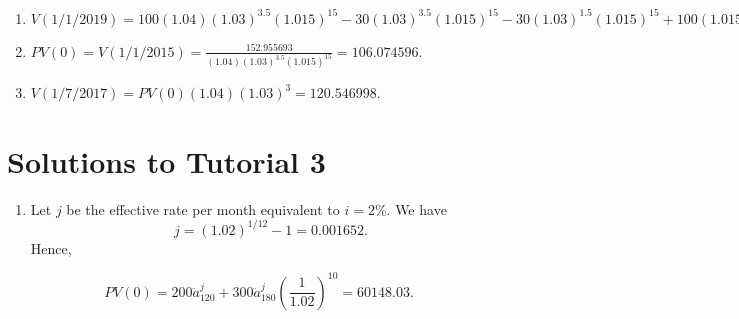 \documentclass[
]{article}
\providecommand{\tightlist}{%
  \setlength{\itemsep}{0pt}\setlength{\parskip}{0pt}}
\theoremstyle{definition}
\theoremstyle{definition}
\theoremstyle{definition}
\theoremstyle{definition}
\theoremstyle{remark}
\begin{document}
\begin{enumerate}
  \begin{enumerate}
  \def\labelenumii{\arabic{enumii}.}
  \tightlist
  \item
    \(V(1/1/2019) = 100(1.04)(1.03)^{3.5}(1.015)^{15} - 30 (1.03)^{3.5} (1.015)^{15}- 30 (1.03)^{1.5} (1.015)^{15} + 100 (1.015)^{12} - 30 = 152.955693.\)
  \item
    \(PV(0)= V(1/1/2015) = \frac{152.955693}{(1.04)(1.03)^{3.5}(1.015)^{15}} =106.074596.\)
  \item
    \(V(1/7/2017) = PV(0)(1.04)(1.03)^3 = 120.546998.\)
  \end{enumerate}
\end{enumerate}

\hypertarget{solutions-to-tutorial-3}{%
\section{Solutions to Tutorial 3}\label{solutions-to-tutorial-3}}

\begin{enumerate}
\def\labelenumi{\arabic{enumi}.}
\tightlist
\item
  Let \(j\) be the effective rate per month equivalent to \(i = 2\)\%. We have
  \[ j = (1.02)^{1/12}  - 1= 0.001652. \]
  Hence,
\end{enumerate}

\[ PV(0) = 200 \ddot{a}^{j}_{120} + 300 \ddot{a}^{j}_{180} \left( \frac{1}{1.02} \right)^{10} = 60148.03. \]
\end{document}

